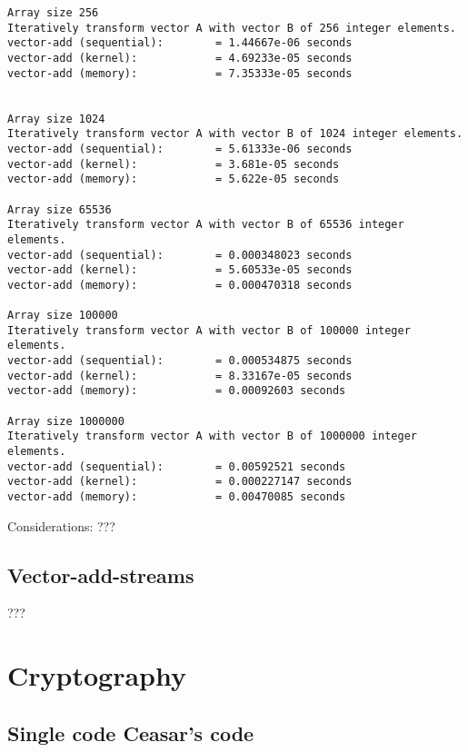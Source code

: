 \documentclass[a4paper]{article}
\begin{document}
\begin{verbatim}
Array size 256
Iteratively transform vector A with vector B of 256 integer elements.
vector-add (sequential): 		= 1.44667e-06 seconds
vector-add (kernel): 		  	= 4.69233e-05 seconds
vector-add (memory): 		  	= 7.35333e-05 seconds


Array size 1024
Iteratively transform vector A with vector B of 1024 integer elements.
vector-add (sequential): 		= 5.61333e-06 seconds
vector-add (kernel): 		  	= 3.681e-05 seconds
vector-add (memory): 		  	= 5.622e-05 seconds

Array size 65536
Iteratively transform vector A with vector B of 65536 integer elements.
vector-add (sequential): 		= 0.000348023 seconds
vector-add (kernel): 		  	= 5.60533e-05 seconds
vector-add (memory): 		    = 0.000470318 seconds

Array size 100000
Iteratively transform vector A with vector B of 100000 integer elements.
vector-add (sequential): 		= 0.000534875 seconds
vector-add (kernel): 		  	= 8.33167e-05 seconds
vector-add (memory): 		  	= 0.00092603 seconds

Array size 1000000
Iteratively transform vector A with vector B of 1000000 integer elements.
vector-add (sequential): 		= 0.00592521 seconds
vector-add (kernel): 		  	= 0.000227147 seconds
vector-add (memory): 		  	= 0.00470085 seconds
\end{verbatim}

Considerations: ???

\subsection{Vector-add-streams}

???

\section{Cryptography}

\subsection{Single code Ceasar's code}
\end{document}
